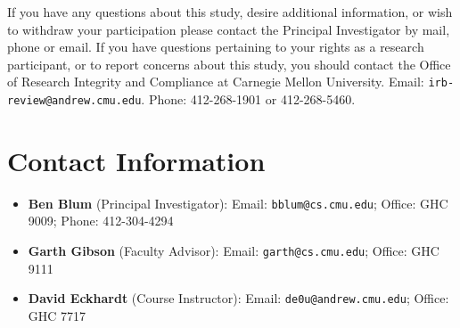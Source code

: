 \documentclass{article}
\begin{document}
\noindent If you have any questions about this study, desire additional information, or wish to withdraw
your participation please contact the Principal Investigator by mail, phone or email.
If you have questions pertaining to your rights as a research participant,
or to report concerns about this study, you should contact the
Office of Research Integrity and Compliance at Carnegie Mellon University.
Email: {\tt irb-review@andrew.cmu.edu}. Phone: 412-268-1901 or 412-268-5460.

\section{Contact Information}

\begin{itemize}
	\item {\bf Ben Blum} (Principal Investigator): Email: {\tt bblum@cs.cmu.edu}; Office: GHC 9009; Phone: 412-304-4294
	\item {\bf Garth Gibson} (Faculty Advisor): Email: {\tt garth@cs.cmu.edu}; Office: GHC 9111
	\item {\bf David Eckhardt} (Course Instructor): Email: {\tt de0u@andrew.cmu.edu}; Office: GHC 7717
\end{itemize}
\end{document}
